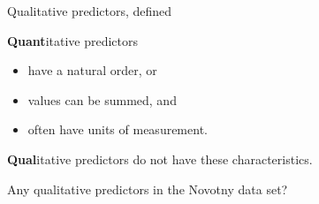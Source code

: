 \documentclass[aspectratio=169]{beamer}
\begin{document}
\begin{frame}{Qualitative predictors, defined}

\textbf{Quant}itative predictors 
\begin{itemize}
\item have a natural order, or
\item values can be summed, and 
\item often have units of measurement.  
\end{itemize}

\vspace{5mm}

\textbf{Qual}itative predictors do not have these characteristics.

\end{frame}

\begin{frame}{Any qualitative predictors in the Novotny data set?}


\end{frame}
\end{document}
